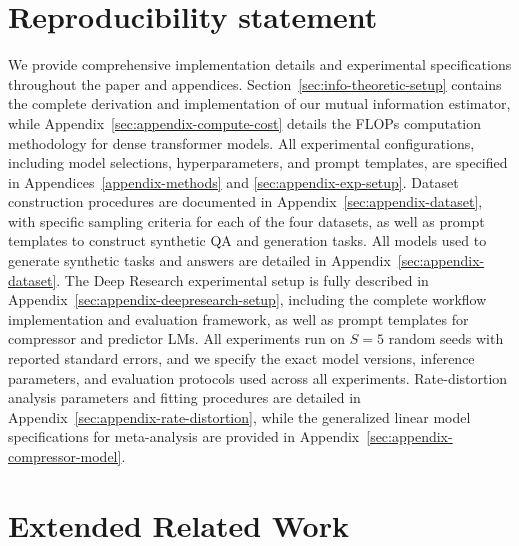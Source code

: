 \documentclass{article} %
\begin{document}
\section*{Reproducibility statement}
We provide comprehensive implementation details and experimental specifications throughout the paper and appendices. Section~\ref{sec:info-theoretic-setup} contains the complete derivation and implementation of our mutual information estimator, while Appendix~\ref{sec:appendix-compute-cost} details the FLOPs computation methodology for dense transformer models. All experimental configurations, including model selections, hyperparameters, and prompt templates, are specified in Appendices~\ref{appendix-methods} and \ref{sec:appendix-exp-setup}. Dataset construction procedures are documented in Appendix~\ref{sec:appendix-dataset}, with specific sampling criteria for each of the four datasets, as well as prompt templates to construct synthetic QA and generation tasks. All models used to generate synthetic tasks and answers are detailed in Appendix~\ref{sec:appendix-dataset}. The Deep Research experimental setup is fully described in Appendix~\ref{sec:appendix-deepresearch-setup}, including the complete workflow implementation and evaluation framework, as well as prompt templates for compressor and predictor LMs. All experiments run on $S=5$ random seeds with reported standard errors, and we specify the exact model versions, inference parameters, and evaluation protocols used across all experiments. Rate-distortion analysis parameters and fitting procedures are detailed in Appendix~\ref{sec:appendix-rate-distortion}, while the generalized linear model specifications for meta-analysis are provided in Appendix~\ref{sec:appendix-compressor-model}.

\newpage

\newpage



\appendix
\newpage

\section{Extended Related Work}
\label{sec:appendix-related-work}
\end{document}
